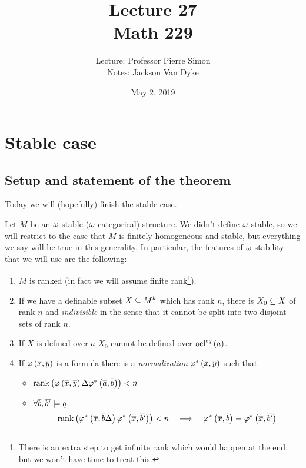 \documentclass{amsart}
\begin{document}
\title{Lecture 27\\ Math 229}
\author{Lecture: Professor Pierre Simon\\ Notes: Jackson Van Dyke}
\date{May 2, 2019}
\maketitle

\section{Stable case}

\subsection{Setup and statement of the theorem}

Today we will (hopefully) finish the stable case. 

Let $M$ be an $\omega$-stable ($\omega$-categorical) structure. 
We didn't define $\omega$-stable, so we will restrict to the case that $M$ is finitely
homogeneous and stable, but everything we say will be true in this generality. 
In particular, the features of $\omega$-stability that we will use are the following:
\begin{enumerate}[label = (\iii)]
\item $M$ is ranked (in fact we will assume finite rank\footnote{There is an extra step to
get infinite rank which would happen at the end, but we won't have time to treat this.}).
\item If we have a definable subset $X\subseteq M^k$ which has rank $n$, there is $X_0\subseteq
X$ of rank $n$ and
\emph{indivisible} in the sense that it cannot be split into two disjoint sets of rank
$n$. 
\item If $X$ is defined over $a$ $X_0$ cannot be defined over $\operatorname{acl}^{eq}\left(a\right)$.
\item If $\varphi\left(\overline{x},\overline{y}\right)$ is a formula there is a
\emph{normalization} $\varphi^*\left(\overline{x},\overline{y}\right)$ such that
\begin{itemize}
\item $\operatorname{rank}\left(\varphi\left(\overline{x},\overline{y}\right)\Delta
\varphi^*\left(\overline{a},\overline{b}\right)\right) < n$
\item $\forall \overline{b}, \overline{b'}\models q$
\begin{align}
\operatorname{rank}\left(\varphi^*\left(\overline{x},\overline{b}\Delta\right) \varphi^*\left(\overline{x} ,
\overline{b'}\right)\right)<n
&&\implies &&
\varphi^*\left(\overline{x},\overline{b}\right) = \varphi^*\left(\overline{x} , \overline{b'}\right)
\end{align}
\end{itemize}
\end{enumerate}
\end{document}
